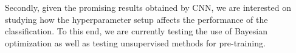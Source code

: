 \documentclass{sig-alternate}
\begin{document}
Secondly, given the promising results obtained by CNN, we are
interested on studying how the hyperparameter setup affects the 
performance of the classification. To this end, we are currently testing
the use of Bayesian optimization as well as testing unsupervised methods
for pre-training.


%

%
%
\end{document}
